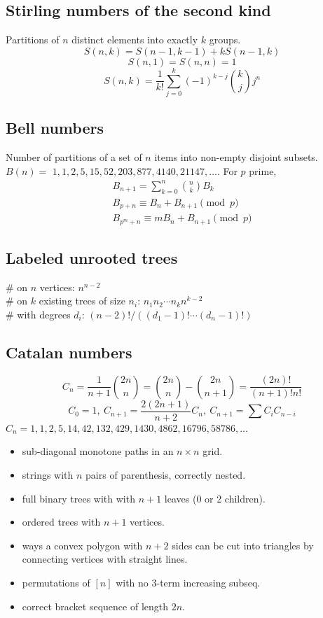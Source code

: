 	\subsection{Stirling numbers of the second kind}
		Partitions of $n$ distinct elements into exactly $k$ groups.
		$$S(n,k) = S(n-1,k-1) + k S(n-1,k)$$
		$$S(n,1) = S(n,n) = 1$$
		$$S(n,k) = \frac{1}{k!}\sum_{j=0}^k (-1)^{k-j}\binom{k}{j}j^n$$

	\subsection{Bell numbers}
		Number of partitions of a set of $n$ items into non-empty disjoint subsets. $B(n) =$
		$1, 1, 2, 5, 15, 52, 203, 877, 4140, 21147, \dots$. For $p$ prime,
		\begin{align*}
		    B_{n+1} = \sum_{k=0}^{n} \binom{n}{k} B_k\\
		    B_{p+n} \equiv B_n + B_{n+1} \pmod{p}\\
		    B_{p^m+n} \equiv mB_n + B_{n+1} \pmod{p}
		\end{align*}

	\subsection{Labeled unrooted trees}
		\# on $n$ vertices: $n^{n-2}$ \\
		\# on $k$ existing trees of size $n_i$: $n_1n_2\cdots n_k n^{k-2}$ \\
		\# with degrees $d_i$: $(n-2)! / ((d_1-1)! \cdots (d_n-1)!)$

	\subsection{Catalan numbers}
		\[ C_n=\frac{1}{n+1}\binom{2n}{n}= \binom{2n}{n}-\binom{2n}{n+1} = \frac{(2n)!}{(n+1)!n!} \]
		\[ C_0=1,\ C_{n+1} = \frac{2(2n+1)}{n+2}C_n,\ C_{n+1}=\sum C_iC_{n-i} \]
		${C_n = 1, 1, 2, 5, 14, 42, 132, 429, 1430, 4862, 16796, 58786, \dots}$
		\begin{itemize}[noitemsep]
			\item sub-diagonal monotone paths in an $n\times n$ grid.
			\item strings with $n$ pairs of parenthesis, correctly nested.
			\item full binary trees with with $n+1$ leaves (0 or 2 children).
			\item ordered trees with $n+1$ vertices.
			\item ways a convex polygon with $n+2$ sides can be cut into triangles by connecting vertices with straight lines.
			\item permutations of $[n]$ with no 3-term increasing subseq.
			\item correct bracket sequence of length $2n$.
		\end{itemize}


